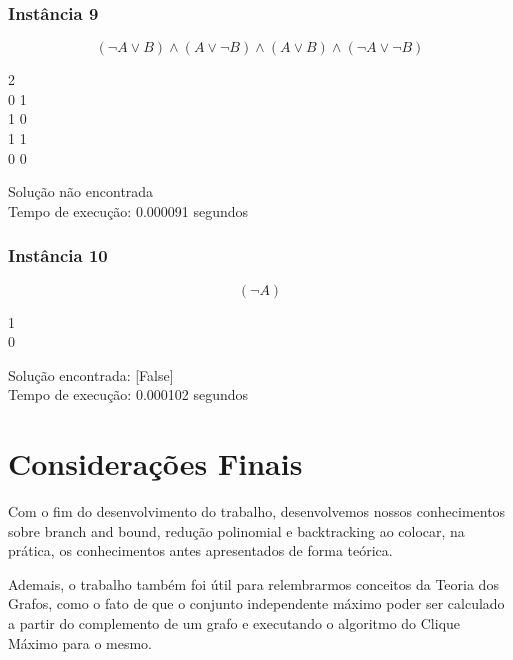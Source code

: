 \documentclass[12pt]{article}
\begin{document}
    \subsubsection{Instância 9}
        \[(\neg A \lor B) \land (A \lor \neg B) \land (A \lor B) \land (\neg A \lor \neg B)\]
        \begin{tcolorbox}[title=Entrada da instância 9, width=\linewidth, fontupper=\ttfamily,  halign=flush left]
            2 \\
            0 1 \\
            1 0 \\
            1 1 \\
            0 0 \\
        \end{tcolorbox}
        \begin{tcolorbox}[title=Saída da instância 9, width=\linewidth, fontupper=\ttfamily, halign=flush left]
            Solução não encontrada \\
            Tempo de execução: 0.000091 segundos
        \end{tcolorbox}
    \subsubsection{Instância 10}
        \[(\neg A )\]
        \begin{tcolorbox}[title=Entrada da instância 10, width=\linewidth, fontupper=\ttfamily,  halign=flush left]
            1 \\
            0 \\
        \end{tcolorbox}
        \begin{tcolorbox}[title=Saída da instância 10, width=\linewidth, fontupper=\ttfamily, halign=flush left]
            Solução encontrada: [False] \\
            Tempo de execução: 0.000102 segundos
        \end{tcolorbox}



\clearpage


\clearpage
\section{Considerações Finais}
    \par Com o fim do desenvolvimento do trabalho, desenvolvemos nossos conhecimentos sobre branch and bound, redução polinomial e backtracking ao colocar, na prática, os conhecimentos antes apresentados de forma teórica.

    \par Ademais, o trabalho também foi útil para relembrarmos conceitos da Teoria dos Grafos, como o fato de que o conjunto independente máximo poder ser calculado a partir do complemento de um grafo e executando o algoritmo do Clique Máximo para o mesmo.

\clearpage

\end{document}
